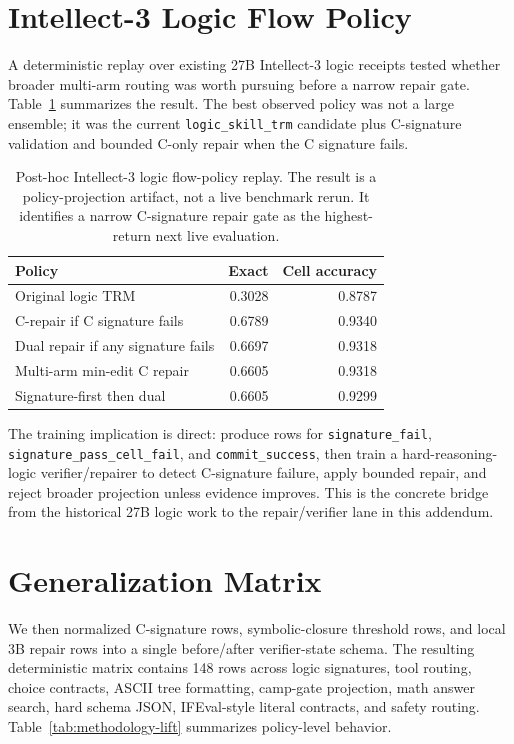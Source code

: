 \documentclass[11pt]{article}
\begin{document}
\section{Intellect-3 Logic Flow Policy}

A deterministic replay over existing 27B Intellect-3 logic receipts tested whether broader multi-arm routing was worth pursuing before a narrow repair gate. Table~\ref{tab:intellect3-flow} summarizes the result. The best observed policy was not a large ensemble; it was the current \texttt{logic\_skill\_trm} candidate plus C-signature validation and bounded C-only repair when the C signature fails.

\begin{table}[t]
  \centering
  \small
  \begin{tabular}{lrr}
    \toprule
    Policy & Exact & Cell accuracy \\
    \midrule
    Original logic TRM & 0.3028 & 0.8787 \\
    C-repair if C signature fails & 0.6789 & 0.9340 \\
    Dual repair if any signature fails & 0.6697 & 0.9318 \\
    Multi-arm min-edit C repair & 0.6605 & 0.9318 \\
    Signature-first then dual & 0.6605 & 0.9299 \\
    \bottomrule
  \end{tabular}
  \caption{Post-hoc Intellect-3 logic flow-policy replay. The result is a policy-projection artifact, not a live benchmark rerun. It identifies a narrow C-signature repair gate as the highest-return next live evaluation.}
  \label{tab:intellect3-flow}
\end{table}

The training implication is direct: produce rows for \texttt{signature\_fail}, \texttt{signature\_pass\_cell\_fail}, and \texttt{commit\_success}, then train a hard-reasoning-logic verifier/repairer to detect C-signature failure, apply bounded repair, and reject broader projection unless evidence improves. This is the concrete bridge from the historical 27B logic work to the repair/verifier lane in this addendum.

\section{Generalization Matrix}

We then normalized C-signature rows, symbolic-closure threshold rows, and local 3B repair rows into a single before/after verifier-state schema. The resulting deterministic matrix contains 148 rows across logic signatures, tool routing, choice contracts, ASCII tree formatting, camp-gate projection, math answer search, hard schema JSON, IFEval-style literal contracts, and safety routing. Table~\ref{tab:methodology-lift} summarizes policy-level behavior.
\end{document}
